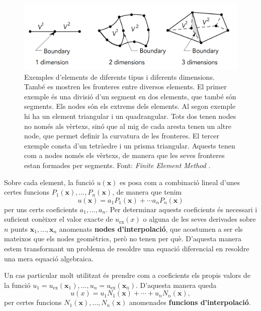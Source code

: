 \documentclass{article}
\begin{document}
\begin{figure}[ht!]
\begin{center}
\includegraphics[scale=0.25]{../grafics/elements/exemples.pdf}
\caption{Exemples d'elements de diferents tipus i diferents dimensions. Tamb\'{e} es mostren les fronteres entre diversos elements. El primer exemple \'{e}s una divisi\'{o} d'un segment en dos elements, que tamb\'{e} s\'{o}n segments. Els nodes s\'{o}n els extrems dels elements. Al segon exemple hi ha un element triangular i un quadrangular. Tots dos tenen nodes no nom\'{e}s als v\`{e}rtexs, sin\'{o} que al mig de cada aresta tenen un altre node, que permet definir la curvatura de les fronteres. El tercer exemple consta d'un tetr\`{a}edre i un prisma triangular. Aquests tenen com a nodes nom\'{e}s els v\`{e}rtexs, de manera que les seves fronteres estan formades per segments. Font: \emph{Finite Element Method} \cite{dhatt2012finite}.}
\label{Fig:Exempleselements}
\end{center}
\end{figure}

Sobre cada element, la funci\'{o} $u(\boldsymbol{x})$ es posa com a combinaci\'{o} lineal d'unes certes funcions $P_1(\boldsymbol{x}),\ldots,P_n(\boldsymbol{x})$, de manera que tenim
\[u(\boldsymbol{x})=a_1P_1(\boldsymbol{x})+\cdots a_nP_n(\boldsymbol{x})\]
per uns certs coeficients $a_1,\ldots,a_n$. Per determinar aquests coeficients \'{e}s necessari i suficient con\`{e}ixer el valor exacte de $u_{\text{ex}}(x)$ o alguna de les seves derivades sobre $n$ punts $\boldsymbol{x}_1,\ldots,\boldsymbol{x}_n$ anomenats \textbf{nodes d'interpolaci\'{o}}, que acostumen a ser els mateixos que els nodes geom\`{e}trics, per\`{o} no tenen per qu\`{e}. D'aquesta manera estem transformant un problema de resoldre una equaci\'{o} diferencial en resoldre una mera equaci\'{o} algebraica.

Un cas particular molt utilitzat \'{e}s prendre com a coeficients els propis valors de la funci\'{o} $u_1=u_{\text{ex}}(\boldsymbol{x}_1),\ldots,u_n=u_{\text{ex}}(\boldsymbol{x}_n)$. D'aquesta manera queda
\[u(x)=u_1N_1(\boldsymbol{x})+\cdots+u_nN_n(\boldsymbol{x}),\]
per certes funcions $N_1(\boldsymbol{x}),\ldots,N_n(\boldsymbol{x})$ anomenades \textbf{funcions d'interpolaci\'{o}}.
\end{document}
